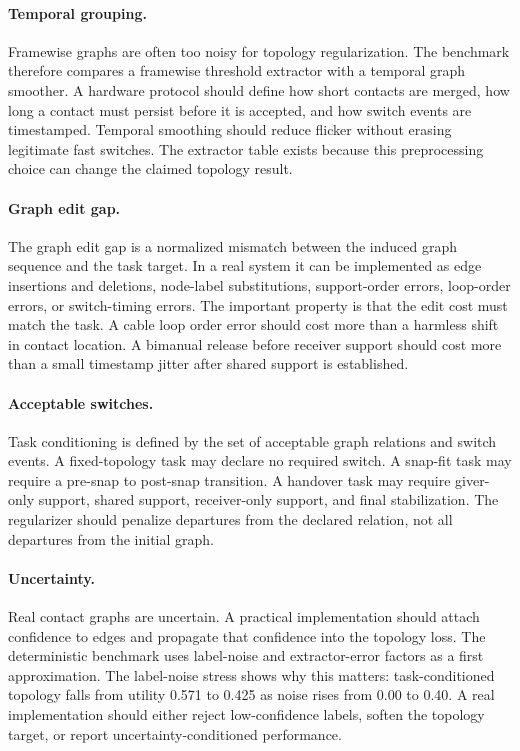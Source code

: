 \documentclass{article}
\begin{document}
\paragraph{Temporal grouping.}
Framewise graphs are often too noisy for topology regularization. The benchmark therefore compares a framewise threshold extractor with a temporal graph smoother. A hardware protocol should define how short contacts are merged, how long a contact must persist before it is accepted, and how switch events are timestamped. Temporal smoothing should reduce flicker without erasing legitimate fast switches. The extractor table exists because this preprocessing choice can change the claimed topology result.

\paragraph{Graph edit gap.}
The graph edit gap is a normalized mismatch between the induced graph sequence and the task target. In a real system it can be implemented as edge insertions and deletions, node-label substitutions, support-order errors, loop-order errors, or switch-timing errors. The important property is that the edit cost must match the task. A cable loop order error should cost more than a harmless shift in contact location. A bimanual release before receiver support should cost more than a small timestamp jitter after shared support is established.

\paragraph{Acceptable switches.}
Task conditioning is defined by the set of acceptable graph relations and switch events. A fixed-topology task may declare no required switch. A snap-fit task may require a pre-snap to post-snap transition. A handover task may require giver-only support, shared support, receiver-only support, and final stabilization. The regularizer should penalize departures from the declared relation, not all departures from the initial graph.

\paragraph{Uncertainty.}
Real contact graphs are uncertain. A practical implementation should attach confidence to edges and propagate that confidence into the topology loss. The deterministic benchmark uses label-noise and extractor-error factors as a first approximation. The label-noise stress shows why this matters: task-conditioned topology falls from utility 0.571 to 0.425 as noise rises from 0.00 to 0.40. A real implementation should either reject low-confidence labels, soften the topology target, or report uncertainty-conditioned performance.
\end{document}
